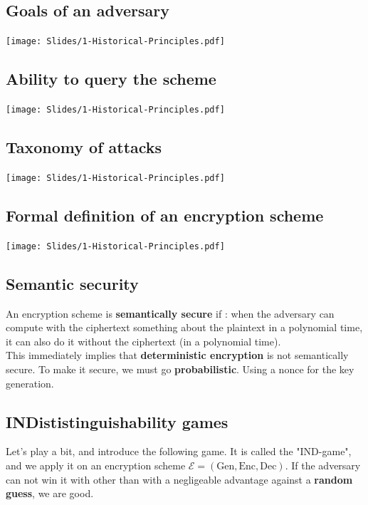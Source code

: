 \documentclass[../Cryptography.tex]{subfiles}
\begin{document}
\subsection{Goals of an adversary}
\texttt{[image: Slides/1-Historical-Principles.pdf]} 

\subsection{Ability to query the scheme}
\texttt{[image: Slides/1-Historical-Principles.pdf]} 

\subsection{Taxonomy of attacks}
\texttt{[image: Slides/1-Historical-Principles.pdf]}

\subsection{Formal definition of an encryption scheme}
\texttt{[image: Slides/1-Historical-Principles.pdf]} 

\subsection{Semantic security}
An encryption scheme is \textbf{semantically secure} if : when the adversary can compute  with the ciphertext something about the plaintext in a polynomial time, it can also do it without the ciphertext (in a polynomial time). \\

This immediately implies that \textbf{deterministic encryption} is not semantically secure. To make it secure, we must go \textbf{probabilistic}. Using a nonce for the key generation.


\subsection{INDististinguishability games}
Let's play a bit, and introduce the following game. It is called the "IND-game", and we apply it on an encryption scheme $\mathcal{E} = (\mathrm{Gen}, \mathrm{Enc}, \mathrm{Dec})$. If the adversary can not win it with other than with a negligeable advantage against a \textbf{random guess}, we are good. \\
\end{document}
